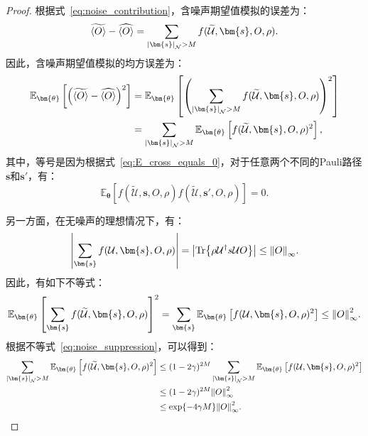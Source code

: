 \begin{proof}
    根据式~\eqref{eq:noise_contribution}，含噪声期望值模拟的误差为：
    \begin{equation}
        \widetilde{\langle O\rangle}-\widehat{\langle O\rangle}=\sum_{\abs{\bm{s}}_{\mathcal{N}}>M}f(\widetilde{\mathcal{U}},\bm{s},O,\rho).
    \end{equation}
    因此，含噪声期望值模拟的均方误差为：
    \begin{equation}
        \begin{aligned}
            \mathbb{E}_{\bm{\theta}}\left[\left(\widetilde{\langle O\rangle}-\widehat{\langle O\rangle}\right)^2\right]&=\mathbb{E}_{\bm{\theta}}\left[\left(\sum_{\abs{\bm{s}}_{\mathcal{N}}>M}f(\widetilde{\mathcal{U}},\bm{s},O,\rho)\right)^2\right]\\
            &=\sum_{\abs{\bm{s}}_{\mathcal{N}}>M}\mathbb{E}_{\bm{\theta}}\left[f(\widetilde{\mathcal{U}},\bm{s},O,\rho)^2\right],
        \end{aligned}
    \end{equation}
    其中，等号是因为根据式~\eqref{eq:E_cross_equals_0}，对于任意两个不同的Pauli路径$\bm{s}$和$\bm{s}'$，有：
    \begin{equation}
        \mathbb{E}_{\bm{\theta}}\left[f(\widetilde{\mathcal{U}},\bm{s},O,\rho)f(\widetilde{\mathcal{U}},\bm{s}',O,\rho)\right]=0.
    \end{equation}
    
    另一方面，在无噪声的理想情况下，有：
    \begin{equation}
        \abs{\sum_{\bm{s}}f(\mathcal{U},\bm{s},O,\rho)}=\abs{\Tr{\rho \mathcal{U}^\dagger s \mathcal{U} O}}\leq\norm{O}_\infty.
    \end{equation}
    因此，有如下不等式：
    \begin{equation}
        \mathbb{E}_{\bm{\theta}}\left[ \sum_{\bm{s}}f(\widetilde{\mathcal{U}},\bm{s},O,\rho)\right]^2=\sum_{\bm{s}}\mathbb{E}_{\bm{\theta}}\left[f(\mathcal{U},\bm{s},O,\rho)^2\right]\leq\norm{O}_\infty^2.
    \end{equation}
    根据不等式~\eqref{eq:noise_suppression}，可以得到：
    \begin{equation}\label{temp:eq:noise_suppression}
        \begin{aligned}
            \sum_{\abs{\bm{s}}_{\mathcal{N}}>M}\mathbb{E}_{\bm{\theta}}\left[f(\widetilde{\mathcal{U}},\bm{s},O,\rho)^2\right] &\leq (1-2\gamma)^{2M} \sum_{\abs{\bm{s}}_{\mathcal{N}}>M}\mathbb{E}_{\bm{\theta}}\left[f(\mathcal{U},\bm{s},O,\rho)^2\right]\\
            &\leq (1-2\gamma)^{2M} \norm{O}_\infty^2\\
            &\leq \exp{-4\gamma M} \norm{O}_\infty^2.
        \end{aligned}
    \end{equation}


\end{proof}
